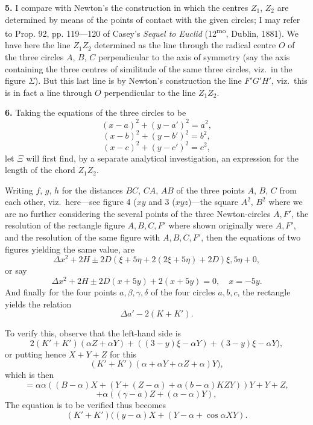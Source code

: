 \documentclass[11pt,a4paper]{book}
\begin{document}
\textbf{5.} I compare with Newton's the construction in which the centres $Z_1$, $Z_2$ are determined by means of the points of contact with the given circles; I may refer to Prop. 92, pp. 119---120 of Casey's \textit{Sequel to Euclid} (12\textsuperscript{mo}, Dublin, 1881). We have here the line $Z_1 Z_2$ determined as the line through the radical centre $O$ of the three circles $A$, $B$, $C$ perpendicular to the axis of symmetry (say the axis containing the three centres of similitude of the same three circles, viz.\ in the figure $\Sigma$). But this last line is by Newton's construction the line $F'G'H'$, viz.\ this is in fact a line through $O$ perpendicular to the line $Z_1 Z_2$.

\textbf{6.} Taking the equations of the three circles to be
\[
(x - a)^2 + (y - a')^2 = a^2,
\]
\[
(x - b)^2 + (y - b')^2 = b^2,
\]
\[
(x - c)^2 + (y - c')^2 = c^2,
\]
let $\Xi$ will first find, by a separate analytical investigation, an expression for the length of the chord $Z_1 Z_2$.

Writing $f$, $g$, $h$ for the distances $BC$, $CA$, $AB$ of the three points $A$, $B$, $C$ from each other, viz.\ here---see figure 4 ($xy$ and 3 ($xyz$)---the square $A^2$, $B^2$ where we are no further considering the several points of the three Newton-circles $A, F'$, the resolution of the rectangle figure $A, B, C, F'$ where shown originally were $A, F'$, and the resolution of the same figure with $A, B, C, F'$, then the equations of two figures yielding the same value, are
\[
\Delta x^2 + 2H \pm 2D (\xi + 5\eta + 2(2\xi + 5\eta) + 2D)\xi, 5\eta + 0,
\]
or say
\[
\Delta x^2 + 2H \pm 2D (x + 5y) + 2(x + 5y) = 0, \quad x = -5y.
\]
And finally for the four points $a, \beta, \gamma, \delta$ of the four circles $a, b, c$, the rectangle yields the relation
\[
\Delta a' - 2(K + K').
\]

To verify this, observe that the left-hand side is
\[
2(K' + K')(\alpha Z + \alpha Y) + ((3 - y)\xi - \alpha Y) + (3 - y)\xi - \alpha Y),
\]
or putting hence $X + Y + Z$ for this
\[
(K' + K')(\alpha + \alpha Y + \alpha Z + \alpha) Y),
\]
which is then
\[
= \alpha\alpha ((B - \alpha)X + (Y + (Z - \alpha) + \alpha(b - \alpha)KZ Y) ) Y + Y + Z,
\]
\[
+ \alpha((\gamma - a)Z + (\alpha - \alpha)Y),
\]
The equation is to be verified thus becomes
\[
(K' + K')((y - \alpha)X + (Y - \alpha + \cos \alpha XY).
\]
\end{document}
